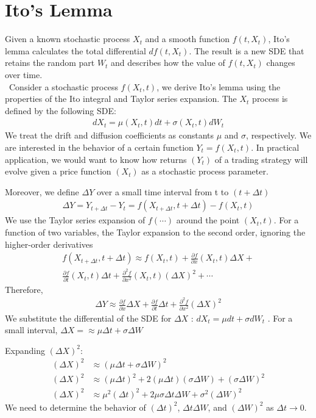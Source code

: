 \section{Ito's Lemma}
Given a known stochastic process $X_t$ and a smooth function $f(t, X_t)$, Ito's lemma calculates the total differential $df(t, X_t)$. The result is a new SDE that retains the random part $W_t$ and describes how the value of $f(t, X_t)$ changes over time.
\\\
Consider a stochastic process $f(X_t, t)$, we derive Ito's lemma using the properties of the Ito integral and Taylor series expansion. The $X_t$ process is defined by the following SDE:
\begin{align} \label{eq:stoch_diff_eq}
dX_t = \mu(X_t,t)dt + \sigma(X_t,t)dW_t
\end{align}
We treat the drift and diffusion coefficients as constants $\mu$ and $\sigma$, respectively. We are interested in the behavior of a certain function $Y_t=f(X_t, t)$. In practical application, we would want to know how returns $(Y_t)$ of a trading strategy will evolve given a price function $(X_t)$ as a stochastic process parameter.

Moreover, we define $\Delta Y$ over a small time interval from t to $(t+\Delta t)$
\begin{align*}
\Delta Y = Y_{t+\Delta t} - Y_t = f(X_{t+\Delta t}, t+\Delta t) - f(X_t, t)
\end{align*}
We use the Taylor series expansion of $f(\cdots)$ around the point $(X_t, t)$.  For a function of two variables, the Taylor expansion to the second order, ignoring the higher-order derivatives
\begin{align*}
f(X_{t+\Delta t}, t+\Delta t) \approx f(X_t,t) + \frac{\partial f}{\partial x}(X_t, t) \Delta X + \\\frac{\partial f}{\partial t} (X_t,t) \Delta t + \frac{\partial^2f}{\partial x^2}(X_t,t)(\Delta X)^2 + \cdots
\end{align*}
Therefore,
\begin{align*}
\Delta Y \approx \frac{\partial f}{\partial x}\Delta X + \frac{\partial f}{\partial t}\Delta t + \frac{\partial^2f}{\partial x^2}(\Delta X)^2
\end{align*}
We substitute the differential of the SDE for $\Delta X$ : $dX_t=\mu dt + \sigma dW_t$ . For a small interval, $\Delta X =\approx \mu \Delta t + \sigma \Delta W$

Expanding $(\Delta X)^2$:
\begin{align*}
(\Delta X)^2 &\approx (\mu \Delta t + \sigma \Delta W)^2\\
(\Delta X)^2 &\approx (\mu \Delta t)^2 + 2 (\mu \Delta t)(\sigma \Delta W) + (\sigma \Delta W)^2\\
(\Delta X)^2 &\approx \mu^2(\Delta t)^2 + 2\mu\sigma \Delta t \Delta W + \sigma^2 (\Delta W)^2
\end{align*}
We need to determine the behavior of $(\Delta t)^2$, $\Delta t \Delta W$, and $(\Delta W)^2$ as $\Delta t \rightarrow 0$.

